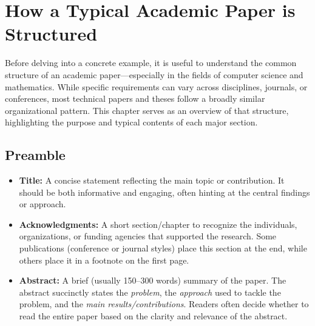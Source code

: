 \chapter{How a Typical Academic Paper is Structured}\label{ch:structure}

Before delving into a concrete example, it is useful to understand the common structure of an academic paper—especially in the fields of computer science and mathematics. While specific requirements can vary across disciplines, journals, or conferences, most technical papers and theses follow a broadly similar organizational pattern. This chapter serves as an overview of that structure, highlighting the purpose and typical contents of each major section.

\section{Preamble}
\begin{itemize}
    \item \textbf{Title:} A concise statement reflecting the main topic or contribution. It should be both informative and engaging, often hinting at the central findings or approach.
    \item \textbf{Acknowledgments:} A short section/chapter to recognize the individuals, organizations, or funding agencies that supported the research. Some publications (conference or journal styles) place this section at the end, while others place it in a footnote on the first page.    
    \item \textbf{Abstract:} A brief (usually 150--300 words) summary of the paper. The abstract succinctly states the \emph{problem}, the \emph{approach} used to tackle the problem, and the \emph{main results/contributions}. Readers often decide whether to read the entire paper based on the clarity and relevance of the abstract.
\end{itemize}

